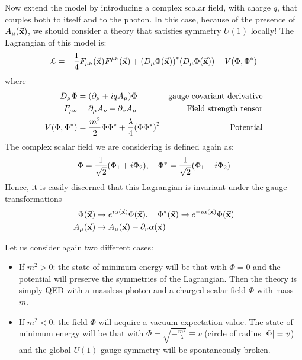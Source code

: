 \documentclass[../../Main/Main.tex]{subfiles}
\begin{document}
Now extend the model by introducing a complex scalar field, with charge \( q \),  that couples both to itself and to the photon. In this case, because of the presence of \( A _ \mu (\va{x}) \), we should consider a theory that satisfies symmetry \( U(1) \) locally! The Lagrangian of this model is:
\begin{equation}
  \mathcal{L} = - \frac{1}{4} F_ {\mu  \nu } (\va{x}) F ^{ \mu \nu } (\va{x})
  + \qty(D _ \mu  \Phi (\va{x}))^* \qty(D _ \mu \Phi (\va{x}))
  - V (\Phi ,\Phi ^*)
\end{equation}
where
\begin{subequations}
\begin{align*}
  D_ \mu \Phi  &= \qty(\partial_ \mu  + i q A _ \mu  ) \Phi   & \text{gauge-covariant derivative}\\
  F_ { \mu \nu } &= \partial_ \mu  A _ \nu  - \partial _ \nu  A _ \mu & \text{Field strength tensor} \\
    V (\Phi , \Phi ^*) &= \frac{m^2}{2} \Phi \Phi ^* + \frac{\lambda }{4} \qty(\Phi \Phi ^*)^2 & \text{Potential}
\end{align*}
\end{subequations}
The complex scalar field we are considering is defined again as:
\begin{equation*}
  \Phi = \frac{1}{\sqrt{2} } \qty(\Phi _1 + i \Phi _2), \quad \Phi ^* = \frac{1}{\sqrt{2} } \qty(\Phi _1 - i \Phi _2)
\end{equation*}
Hence, it is easily discerned that this Lagrangian is invariant under the gauge transformations
\begin{subequations}
\begin{align*}
     \Phi  ( \va{x} ) &\rightarrow e^{i \alpha (\va{x})} \Phi (\va{x}), \quad \Phi^*  ( \va{x} ) \rightarrow e^{-i \alpha (\va{x})} \Phi (\va{x})   \\
      A_\mu (\va{x}) &\rightarrow A_\mu (\va{x}) - \partial_ \nu \alpha  (\va{x})
\end{align*}
\end{subequations}


Let us consider again two different cases:
\begin{itemize}
\item If \( m^2 >0 \): the state of minimum energy will be that with \( \Phi =0 \) and the potential will preserve the symmetries of the Lagrangian. Then the theory is simply QED with a massless photon and a charged scalar field \( \Phi  \) with mass \( m \).

\item If \( m^2 <0 \):  the field \( \Phi  \)  will acquire a vacuum expectation value. The state of minimum energy will be that with  \( \Phi = \sqrt{- \frac{m^2}{\lambda }} \equiv v  \)    (circle of radius \( \abs{\Phi } = v \)) and the global \( U(1) \)  gauge symmetry will be spontaneously broken.
\end{itemize}
\end{document}
